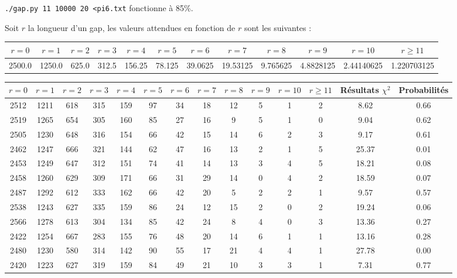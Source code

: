 \documentclass[12pt,a4paper]{article}
\begin{document}
\texttt{./gap.py 11 10000 20 <pi6.txt} fonctionne à 85\%.

Soit $r$ la longueur d'un gap, les valeurs attendues en fonction de $r$ sont les suivantes : 
\begin{center}
\begin{tabular}{|c|c|c|c|c|c|c|c|c|c|c|c|}
\hline
$r = 0$ & $r = 1$ & $r = 2$ & $r = 3$ & $r = 4$ & $r = 5$ & $r = 6$ & $r = 7$ & $r = 8$ & $r = 9$ & $r = 10$ & $r \geq 11$\\ \hline
2500.0 & 1250.0 & 625.0 & 312.5 & 156.25 & 78.125 & 39.0625 & 19.53125 & 9.765625 & 4.8828125 & 2.44140625 & 1.220703125\\ \hline
\end{tabular}
\end{center}
\begin{center}
\begin{tabular}{|c|c|c|c|c|c|c|c|c|c|c|c|c|c|}
\hline
$r = 0$ & $r = 1$ & $r = 2$ & $r = 3$ & $r = 4$ & $r = 5$ & $r = 6$ & $r = 7$ & $r = 8$ & $r = 9$ & $r = 10$ & $r \geq 11$ & Résultats $\chi^2$ & Probabilités \\ \hline
2512 & 1211 & 618 & 315 & 159 & 97 & 34 & 18 & 12 & 5 & 1 & 2 &  8.62 &  0.66\\ \hline
2519 & 1265 & 654 & 305 & 160 & 85 & 27 & 16 & 9 & 5 & 1 & 0 &  9.04 &  0.62\\ \hline
2505 & 1230 & 648 & 316 & 154 & 66 & 42 & 15 & 14 & 6 & 2 & 3 &  9.17 &  0.61\\ \hline
2462 & 1247 & 666 & 321 & 144 & 62 & 47 & 16 & 13 & 2 & 1 & 5 & 25.37 &  0.01\\ \hline
2453 & 1249 & 647 & 312 & 151 & 74 & 41 & 14 & 13 & 3 & 4 & 5 & 18.21 &  0.08\\ \hline
2458 & 1260 & 629 & 309 & 171 & 66 & 31 & 29 & 14 & 0 & 4 & 2 & 18.59 &  0.07\\ \hline
2487 & 1292 & 612 & 333 & 162 & 66 & 42 & 20 & 5 & 2 & 2 & 1 &  9.57 &  0.57\\ \hline
2538 & 1243 & 627 & 335 & 159 & 86 & 24 & 12 & 15 & 2 & 0 & 2 & 19.24 &  0.06\\ \hline
2566 & 1278 & 613 & 304 & 134 & 85 & 42 & 24 & 8 & 4 & 0 & 3 & 13.36 &  0.27\\ \hline
2422 & 1254 & 667 & 283 & 155 & 76 & 48 & 20 & 14 & 6 & 1 & 1 & 13.16 &  0.28\\ \hline
2480 & 1230 & 580 & 314 & 142 & 90 & 55 & 17 & 21 & 4 & 4 & 1 & 27.78 &  0.00\\ \hline
2420 & 1223 & 627 & 319 & 159 & 84 & 49 & 21 & 10 & 3 & 3 & 1 &  7.31 &  0.77\\ \hline

\end{tabular}
\end{center}
\end{document}
